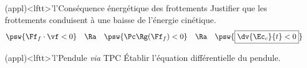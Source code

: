 \documentclass[../../main/main.tex]{subfiles}
\begin{document}
\begin{tcb*}(appl)<lftt>'l'{Conséquence énergétique des frottements}
	Justifier que les frottements conduisent à une baisse de l'énergie
	cinétique.
	\tcblower
	\vspace{-15pt}
	\begin{gather*}
		\psw{\Ff_{f}\cdot\vf < 0}
		\quad \Ra \quad
		\psw{\Pc\Rg(\Ff_f) < 0}
		\quad \Ra \quad
		\psw{\boxed{\dv{\Ec_c}{t} < 0}}
	\end{gather*}
	\vspace*{-25pt}
\end{tcb*}
\vspace{-15pt}
\begin{tcb*}(appl)<lftt>'l'{Pendule \textit{via} TPC}
	Établir l'équation différentielle du pendule.
	\tcblower
	\begin{minipage}{0.25\linewidth}
		\begin{center}
\end{center}
\end{minipage}
\end{tcb*}
\end{document}
